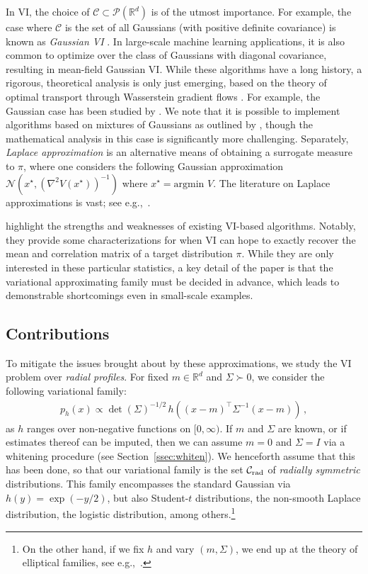 \documentclass[twoside]{article}
\newcommand{\cC}{\mathcal{C}}
\newcommand{\cN}{\mathcal{N}}
\newcommand{\cP}{\mathcal{P}}
\newcommand{\1}{\mathds{1}}
\newcommand{\R}{\mathbb{R}}
\theoremstyle{plain}
\theoremstyle{definition}
\theoremstyle{remark}
\begin{document}
In VI, the choice of $\cC \subset \cP(\R^d)$ is of the utmost importance. For example, the case where $\cC$ is the set of all Gaussians (with positive definite covariance) is known as \emph{Gaussian VI} \citep{BarBis1997Ensemble, See1999BayesianModel, OppArc09VarGauss}. In large-scale machine learning applications, it is also common to optimize over the class of Gaussians with diagonal covariance, resulting in mean-field Gaussian VI. While these algorithms have a long history, a rigorous, theoretical analysis is only just emerging, based on the theory of optimal transport through Wasserstein gradient flows \citep{ambrosio2008gradient}. For example, the Gaussian case has been studied by \cite{Lambert2022,Diao2023, kim2023convergence}. We note that it is possible to implement algorithms based on mixtures of Gaussians as outlined by \citet{Lambert2022,petit2025variational}, though the mathematical analysis in this case is significantly more challenging. Separately, \emph{Laplace approximation} is an alternative means of obtaining a surrogate measure to $\pi$, where one considers the following Gaussian approximation $ \cN(x^\star,(\nabla^2V(x^\star))^{-1})$
where $x^\star = \text{argmin} \, \, V$. The literature on Laplace approximations is vast; see e.g.,~\citet{Robert2004}.

\cite{margossian2025variational} highlight the strengths and weaknesses of existing VI-based algorithms. Notably, they provide some characterizations for when VI can hope to exactly recover the mean and correlation matrix of a target distribution $\pi$. While they are only interested in these particular statistics, a key detail of the paper is that the variational approximating family must be decided in advance, which leads to demonstrable shortcomings even in small-scale examples.



\subsection{Contributions}
To mitigate the issues brought about by these approximations, we study the VI problem over \emph{radial profiles}. For fixed $m \in \R^d$ and $\Sigma \succ 0$, we consider the following variational family:
\begin{align*}
    p_h(x) \propto \det(\Sigma)^{-1/2}\,h((x-m)^\top\Sigma^{-1}(x-m))\,,
\end{align*}
{as $h$ ranges over non-negative functions on $[0,\infty)$.
If $m$ and $\Sigma$ are known, or if estimates thereof can be imputed, then we can assume $m=0$ and $\Sigma=I$ via a whitening procedure (see Section~\ref{ssec:whiten}). We henceforth assume that this has been done, so that our variational family is the set $\cC_{\rm rad}$ of \emph{radially symmetric} distributions.} This family encompasses the standard Gaussian via $h(y) = \exp(-y/2)$, but also Student-$t$ distributions, the non-smooth Laplace distribution, the logistic distribution, among others.\footnote{On the other hand, if we fix $h$ and vary $(m,\Sigma)$, we end up at the theory of elliptical families, see e.g.,~\citet[Section 1.4]{Mui1982Multivariate}.}
\end{document}

